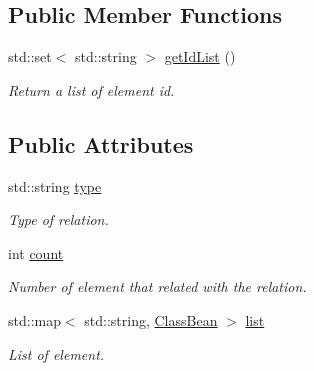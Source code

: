 \subsection*{Public Member Functions}
\begin{DoxyCompactItemize}
\item 
std\-::set$<$ std\-::string $>$ \hyperlink{structunisys_1_1ClassBean_1_1relationDataStructure_a43ca1b9ff2c0a61bd5c10e4d4fc4e833}{get\-Id\-List} ()
\begin{DoxyCompactList}\small\item\em Return a list of element id. \end{DoxyCompactList}\end{DoxyCompactItemize}
\subsection*{Public Attributes}
\begin{DoxyCompactItemize}
\item 
std\-::string \hyperlink{structunisys_1_1ClassBean_1_1relationDataStructure_a4110e88e6d07e6067637713c20304db8}{type}
\begin{DoxyCompactList}\small\item\em Type of relation. \end{DoxyCompactList}\item 
int \hyperlink{structunisys_1_1ClassBean_1_1relationDataStructure_a6111fa1f2a6c47891076d1b2a3de945f}{count}
\begin{DoxyCompactList}\small\item\em Number of element that related with the relation. \end{DoxyCompactList}\item 
std\-::map$<$ std\-::string, \hyperlink{classunisys_1_1ClassBean}{Class\-Bean} $>$ \hyperlink{structunisys_1_1ClassBean_1_1relationDataStructure_af73ee1fa6aa421666df4fd3bc9a33280}{list}
\begin{DoxyCompactList}\small\item\em List of element. \end{DoxyCompactList}\end{DoxyCompactItemize}


